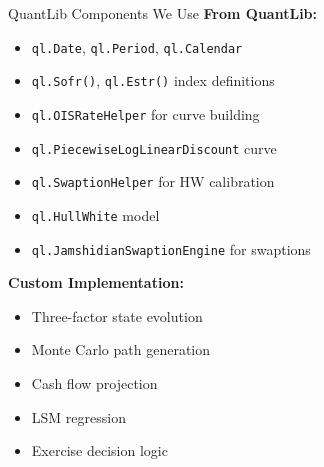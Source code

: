\documentclass[aspectratio=169,11pt]{beamer}
\begin{document}
\begin{frame}{QuantLib Components We Use}
\textbf{From QuantLib:}
\begin{itemize}
    \item \texttt{ql.Date}, \texttt{ql.Period}, \texttt{ql.Calendar}
    \item \texttt{ql.Sofr()}, \texttt{ql.Estr()} index definitions
    \item \texttt{ql.OISRateHelper} for curve building
    \item \texttt{ql.PiecewiseLogLinearDiscount} curve
    \item \texttt{ql.SwaptionHelper} for HW calibration
    \item \texttt{ql.HullWhite} model
    \item \texttt{ql.JamshidianSwaptionEngine} for swaptions
\end{itemize}

\textbf{Custom Implementation:}
\begin{itemize}
    \item Three-factor state evolution
    \item Monte Carlo path generation
    \item Cash flow projection
    \item LSM regression
    \item Exercise decision logic
\end{itemize}
\end{frame}
\end{document}
